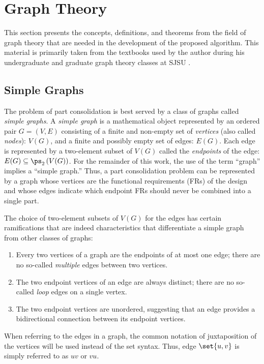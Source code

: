 \section{Graph Theory}\label{sec:theory}

This section presents the concepts, definitions, and theorems from the field of graph theory that are needed in the
development of the proposed algorithm.  This material is primarily taken from the textbooks used
by the author during his undergraduate and graduate graph theory classes at SJSU \cite{chartrand,west}.

\subsection{Simple Graphs}\label{sec:sub:simple}

The problem of part consolidation is best served by a class of graphs called \emph{simple graphs}.  A \emph{simple
  graph} is a mathematical object represented by an ordered pair \(G=(V,E)\) consisting of a finite and non-empty
set of \emph{vertices} (also called \emph{nodes}): \(V(G)\), and a finite and possibly empty set of edges:
\(E(G)\).  Each edge is represented by a two-element subset of \(V(G)\) called the \emph{endpoints} of the edge:
\(E(G)\subseteq\ps_2\left(V(G)\right)\).  For the remainder of this work, the use of the term ``graph'' implies a
``simple graph.''  Thus, a part consolidation problem can be represented by a graph whose vertices are the
functional requirements (FRs) of the design and whose edges indicate which endpoint FRs should never be combined
into a single part.

The choice of two-element subsets of \(V(G)\) for the edges has certain ramifications that are indeed characteristics
that differentiate a simple graph from other classes of graphs:
\begin{enumerate}
\item Every two vertices of a graph are the endpoints of at most one edge; there are no so-called
  \emph{multiple} edges between two vertices.
\item The two endpoint vertices of an edge are always distinct; there are no so-called \emph{loop} edges on a
  single vertex.
\item The two endpoint vertices are unordered, suggesting that an edge provides a bidirectional connection between
  its endpoint vertices.
\end{enumerate}
When referring to the edges in a graph, the common notation of juxtaposition of the vertices will be used instead of
the set syntax.  Thus, edge \(\set{u,v}\) is simply referred to as \(uv\) or \(vu\).

